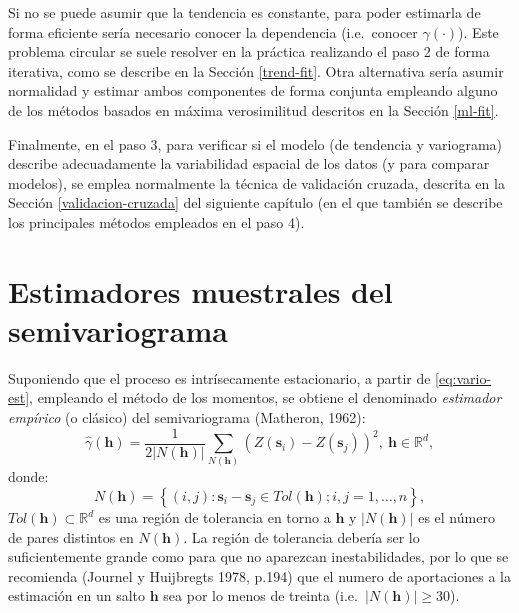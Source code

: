 \documentclass[
  spanish,
]{book}
\theoremstyle{break}
\theoremstyle{definition}
\theoremstyle{definition}
\theoremstyle{definition}
\theoremstyle{definition}
\theoremstyle{remark}
\begin{document}
Si no se puede asumir que la tendencia es constante, para poder estimarla de forma eficiente sería necesario conocer la dependencia (i.e.~conocer \(\gamma(\cdot)\)).
Este problema circular se suele resolver en la práctica realizando el paso 2 de forma iterativa, como se describe en la Sección \ref{trend-fit}.
Otra alternativa sería asumir normalidad y estimar ambos componentes de forma conjunta empleando alguno de los métodos basados en máxima verosimilitud descritos en la Sección \ref{ml-fit}.

Finalmente, en el paso 3, para verificar si el modelo (de tendencia y variograma) describe adecuadamente la variabilidad espacial de los datos (y para comparar modelos), se emplea normalmente la técnica de validación cruzada, descrita en la Sección \ref{validacion-cruzada} del siguiente capítulo (en el que también se describe los principales métodos empleados en el paso 4).

\hypertarget{vario-muestrales}{%
\section{Estimadores muestrales del semivariograma}\label{vario-muestrales}}

Suponiendo que el proceso es intrísecamente estacionario, a partir de \eqref{eq:vario-est}, empleando el método de los momentos, se obtiene el denominado \emph{estimador empírico} (o clásico) del semivariograma (Matheron, 1962):
\[\hat{\gamma}(\mathbf{h}) = \dfrac{1}{2\left| N(\mathbf{h})\right| }
\sum\limits_{N(\mathbf{h})}\left( Z(\mathbf{s}_{i})-Z(\mathbf{s}_{j} )\right) ^2 ,\ \mathbf{h}\in \mathbb{R}^{d},\]
donde:
\[N(\mathbf{h}) = \left\{ (i,j):\mathbf{s}_{i} -\mathbf{s}_{j} \in Tol(\mathbf{h});i,j=1,\ldots,n\right\},\]
\(Tol(\mathbf{h})\subset \mathbb{R}^{d}\) es una región de tolerancia en torno a \(\mathbf{h}\) y \(\left| N(\mathbf{h})\right|\) es el número de pares distintos en \(N(\mathbf{h})\).
La región de tolerancia debería ser lo suficientemente grande como para que no aparezcan inestabilidades, por lo que se recomienda (Journel y Huijbregts 1978, p.194) que el numero de aportaciones a la estimación en un salto \(\mathbf{h}\) sea por lo menos de treinta (i.e.~\(\left| N(\mathbf{h})\right| \geq 30\)).
\end{document}
